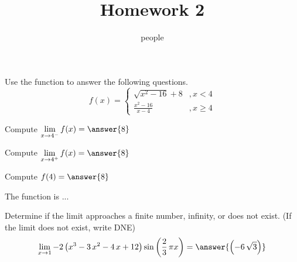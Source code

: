 \documentclass[•]{ximera}
\title{Homework 2}
\author{people}
\begin{document}
\maketitle


\begin{shuffle}
\begin{problem}

Use the function to answer the following questions.
\[f(x)=\left\{\begin{array}{ll}{{\sqrt{x^{2} - 16} + 8}}&,x<{{4}}\\[5pt]
{{\frac{x^{2} - 16}{x - 4}}}&,x\geq{{4}}
\end{array}\right.\]
\begin{shuffle}
\begin{problem}
Compute $\lim\limits_{x\to{{4}}^-}f(x)=\answer{{{8}}}$\\[1in]
\end{problem}
\begin{problem}
Compute $\lim\limits_{x\to{{4}}^+}f(x)=\answer{{{8}}}$\\[1in]
\end{problem}
\begin{problem}
Compute $f({{4}})=\answer{{{8}}}$\\[1in]
\end{problem}
\begin{problem}
The function is ...
\begin{multipleChoice}
\end{multipleChoice}
\end{problem}
\end{shuffle}
\end{problem}%





\begin{problem}
Determine if the limit approaches a finite number, infinity, or does not exist. (If the limit does not exist, write DNE)
\[\lim_{x\to{{1}}}{{-2 \, {\left(x^{3} - 3 \, x^{2} - 4 \, x + 12\right)} \sin\left(\frac{2}{3} \, \pi x\right)}}=\answer{{{\left(-6 \, \sqrt{3}\right)}}}\]

\end{problem}%
\end{shuffle}
\end{document}
